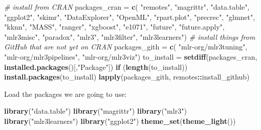 \documentclass[]{article}
\newenvironment{Shaded}{\begin{snugshade}}{\end{snugshade}}
\newcommand{\CommentTok}[1]{\textcolor[rgb]{0.56,0.35,0.01}{\textit{#1}}}
\newcommand{\ControlFlowTok}[1]{\textcolor[rgb]{0.13,0.29,0.53}{\textbf{#1}}}
\newcommand{\KeywordTok}[1]{\textcolor[rgb]{0.13,0.29,0.53}{\textbf{#1}}}
\newcommand{\NormalTok}[1]{#1}
\newcommand{\OperatorTok}[1]{\textcolor[rgb]{0.81,0.36,0.00}{\textbf{#1}}}
\newcommand{\StringTok}[1]{\textcolor[rgb]{0.31,0.60,0.02}{#1}}
\begin{document}
\begin{Shaded}
\begin{Highlighting}[]
\CommentTok{# install from CRAN}
\NormalTok{packages_cran =}\StringTok{ }\KeywordTok{c}\NormalTok{(}
    \StringTok{"remotes"}\NormalTok{, }\StringTok{"magrittr"}\NormalTok{, }\StringTok{"data.table"}\NormalTok{, }\StringTok{"ggplot2"}\NormalTok{, }\StringTok{"skimr"}\NormalTok{, }\StringTok{"DataExplorer"}\NormalTok{,}
    \StringTok{"OpenML"}\NormalTok{, }\StringTok{"rpart.plot"}\NormalTok{, }\StringTok{"precrec"}\NormalTok{,}
    \StringTok{"glmnet"}\NormalTok{, }\StringTok{"kknn"}\NormalTok{, }\StringTok{"MASS"}\NormalTok{, }\StringTok{"ranger"}\NormalTok{, }\StringTok{"xgboost"}\NormalTok{, }\StringTok{"e1071"}\NormalTok{,}
    \StringTok{"future"}\NormalTok{, }\StringTok{"future.apply"}\NormalTok{,}
    \StringTok{"mlr3misc"}\NormalTok{, }\StringTok{"paradox"}\NormalTok{, }\StringTok{"mlr3"}\NormalTok{, }\StringTok{"mlr3filter"}\NormalTok{, }\StringTok{"mlr3learners"}\NormalTok{)}
\CommentTok{# install things from GitHub that are not yet on CRAN}
\NormalTok{packages_gith =}\StringTok{ }\KeywordTok{c}\NormalTok{(}
    \StringTok{"mlr-org/mlr3tuning"}\NormalTok{, }\StringTok{"mlr-org/mlr3pipelines"}\NormalTok{, }\StringTok{"mlr-org/mlr3viz"}\NormalTok{)}
\NormalTok{to_install =}\StringTok{ }\KeywordTok{setdiff}\NormalTok{(packages_cran, }\KeywordTok{installed.packages}\NormalTok{()[,}\StringTok{"Package"}\NormalTok{])}
\ControlFlowTok{if}\NormalTok{ (}\KeywordTok{length}\NormalTok{(to_install)) }\KeywordTok{install.packages}\NormalTok{(to_install)}
\KeywordTok{lapply}\NormalTok{(packages_gith, remotes}\OperatorTok{::}\NormalTok{install_github)}
\end{Highlighting}
\end{Shaded}

Load the packages we are going to use:

\begin{Shaded}
\begin{Highlighting}[]
\KeywordTok{library}\NormalTok{(}\StringTok{"data.table"}\NormalTok{)}
\KeywordTok{library}\NormalTok{(}\StringTok{"magrittr"}\NormalTok{)}
\KeywordTok{library}\NormalTok{(}\StringTok{"mlr3"}\NormalTok{)}
\KeywordTok{library}\NormalTok{(}\StringTok{"mlr3learners"}\NormalTok{)}
\KeywordTok{library}\NormalTok{(}\StringTok{"ggplot2"}\NormalTok{)}
\KeywordTok{theme_set}\NormalTok{(}\KeywordTok{theme_light}\NormalTok{())}
\end{Highlighting}
\end{Shaded}
\end{document}
